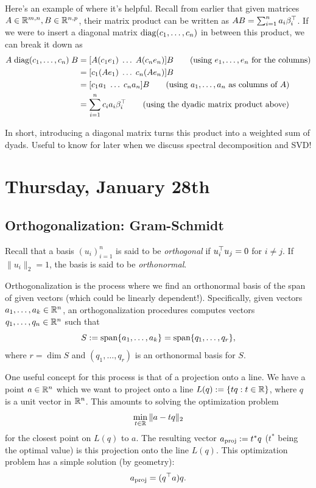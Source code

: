 \documentclass[11 pt]{scrartcl}
\begin{document}
Here's an example of where it's helpful. 
Recall from earlier that given matrices $A\in \mathbb R^{m,n}, B \in \mathbb R^{n,p}$, their matrix product can be written as $AB = \sum_{i=1}^n a_i \beta_i^\top$.  
If we were to insert a diagonal matrix $\text{diag}(c_1,\dots, c_n)$ in between this product, we can break it down as 
\begin{align*}
    A \;\text{diag}(c_1, \dots, c_n)\; B &= [A(c_1e_1)\; \dots \; A(c_n e_n)] B  \tag{using $e_1, \dots, e_n$ for the columns} \\
                                   &= [c_1 (Ae_1)\; \dots \; c_n (Ae_n)] B \\ 
                                   &= [c_1 a_1 \; \dots \; c_n a_n ] B \tag{using $a_1,\dots, a_n$ as columns of $A$}\\ 
                                   &= \sum_{i=1}^n c_i a_i\beta_i^\top \tag{using the dyadic matrix product above}
\end{align*}

In short, introducing a diagonal matrix turns this product into a weighted sum of dyads.
Useful to know for later when we discuss spectral decomposition and SVD!

\newpage
\section{Thursday, January 28th}

\subsection{Orthogonalization: Gram-Schmidt}
Recall that a basis $(u_i)_{i=1}^n$ is said to be \emph{orthogonal} if $u_i^\top u_j = 0$ for $i\not= j$. 
If $\|u_i\|_2 = 1$, the basis is said to be \emph{orthonormal}.


Orthogonalization is the process where we find an orthonormal basis of the span of given vectors (which could be linearly dependent!). 
Specifically, given vectors $a_1, \dots, a_k\in \mathbb R^n$, an orthogonalization procedures computes vectors $q_1, \dots, q_n\in \mathbb R^n$ such that 
\[ S:= \text{span} \{a_1, \dots, a_k\} = \text{span}\{q_1,\dots,q_r\},\] 
where $r = \dim S$ and $(q_1, \dots, q_r)$ is an orthonormal basis for $S$. 

One useful concept for this process is that of a projection onto a line. 
We have a point $a\in \mathbb R^n$ which we want to project onto a line $L(q) := \{tq : t\in \mathbb R\}$, where $q$ is a unit vector in $\mathbb R^n$. 
This amounts to solving the optimization problem 
\[ \min_{t\in \mathbb R} \|a-tq\|_2\] 
for the closest point on $L(q)$ to $a$. 
The resulting vector $a_{\text{proj}} := t^* q$ ($t^*$ being the optimal value) is this projection onto the line $L(q)$. 
This optimization problem has a simple solution (by geometry):
\[ a_{\text{proj}} = (q^\top a) q.\] 
\end{document}
